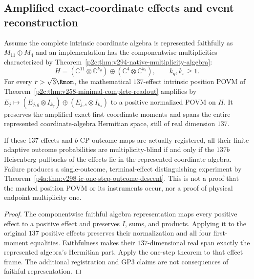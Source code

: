 \documentclass[12pt,a4paper]{article}
\begin{document}
\subsection{Amplified exact-coordinate effects and event reconstruction}
\begin{corollary}
\label{p2c:cor:v298-amplified-coordinate-ic-one-step}
Assume the complete intrinsic coordinate algebra is represented faithfully
as $M_{11}\oplus M_4$ and an implementation has the componentwise
multiplicities characterized by
Theorem~\ref{p2c:thm:v294-native-multiplicity-algebra}:
\[
H=(\mathbb C^{11}\otimes\mathbb C^{k_g})\oplus
  (\mathbb C^4\otimes\mathbb C^{k_s}),\qquad k_g,k_s\ge1.
\]
For every $r>\sqrt3\Rmom$, the mathematical $137$-effect intrinsic
position POVM of
Theorem~\ref{p2c:thm:v258-minimal-complete-readout}
amplifies by $E_j\mapsto (E_{j,g}\otimes I_{k_g})\oplus
(E_{j,s}\otimes I_{k_s})$ to a positive normalized POVM on $H$.
It preserves the amplified exact first coordinate moments and spans the
entire represented coordinate-algebra Hermitian space, still of real
dimension $137$.

If these $137$ effects and $b$ CP outcome maps are actually registered,
all their finite adaptive outcome probabilities are multiplicity-blind
if and only if the $137b$ Heisenberg pullbacks of the effects lie in the
represented coordinate algebra. Failure produces a single-outcome,
terminal-effect distinguishing experiment by
Theorem~\ref{p4a:thm:v298-ic-one-step-outcome-descent}.
This is not a proof that the marked position POVM or its instruments occur,
nor a proof of physical endpoint multiplicity one.
\end{corollary}
\begin{proof}
The componentwise faithful algebra representation maps every positive
effect to a positive effect and preserves $I$, sums, and products.
Applying it to the original $137$ positive effects preserves their
normalization and all four first-moment equalities. Faithfulness makes
their $137$-dimensional real span exactly the represented algebra's
Hermitian part. Apply the one-step theorem to that effect frame.
The additional registration and GP3 claims are not consequences of
faithful representation.
\end{proof}
\end{document}
